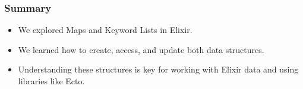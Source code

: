 \documentclass[aspectratio=169, table]{beamer}
\begin{document}
	\begin{frame}
		\frametitle{Summary}
		\begin{itemize}
			\item We explored Maps and Keyword Lists in Elixir.
			\item We learned how to create, access, and update both data structures.
			\item Understanding these structures is key for working with Elixir data and using libraries like Ecto.
		\end{itemize}
	\end{frame}
	
\end{document}
